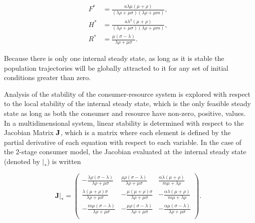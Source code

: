 \documentclass[12pt,english]{article}
\begin{document}
\begin{spacing}{1.9}
\begin{align}
F^* &= \frac{a  \lambda  \mu  (\mu +\rho )}{(\lambda  \rho +\mu  \sigma ) (\lambda  \rho +\mu  m)}, \nonumber \\
H^* &= \frac{a  \lambda ^2 (\mu +\rho )}{(\lambda  \rho +\mu  \sigma ) (\lambda  \rho +\mu  m)}, \nonumber \\
R^* &= \frac{\mu  (\sigma -\lambda )}{\lambda  \rho +\mu  \sigma }.
\end{align}

\noindent Because there is only one internal steady state, as long as it is stable the population trajectories will be globally attracted to it for any set of initial conditions greater than zero.

Analysis of the stability of the consumer-resource system is explored with respect to the local stability of the internal steady state, which is the only feasible steady state as long as both the consumer and resource have non-zero, positive, values.
In a multidimensional system, linear stability is determined with respect to the Jacobian Matrix $\bf J$, which is a matrix where each element is defined by the partial derivative of each equation with respect to each variable.
In the case of the 2-stage consumer model, the Jacobian evaluated at the internal steady state (denoted by $|_*$) is written

\begin{equation}
\mathbf{J}|_* =
\left(
\begin{array}{ccc}
 -\frac{\lambda  \rho  (\sigma - \lambda )}{\lambda  \rho +\mu  \sigma } & \frac{\mu  \rho  (\sigma -\lambda )}{\lambda  \rho +\mu  \sigma } & \frac{\alpha  \lambda  (\mu +\rho )}{m \mu +\lambda  \rho } \\
 \frac{\lambda  (\mu +\rho ) \sigma }{\lambda  \rho +\mu  \sigma } & -\frac{\mu  (\mu +\rho ) \sigma }{\lambda  \rho +\mu  \sigma } & -\frac{\alpha  \lambda  (\mu +\rho )}{m \mu +\lambda  \rho } \\
 -\frac{m \mu  (\sigma - \lambda)}{\lambda  \rho +\mu  \sigma } & -\frac{\mu  \rho  (\sigma - \lambda )}{\lambda  \rho +\mu  \sigma } & -\frac{\alpha  \mu  (\sigma - \lambda)}{\lambda  \rho +\mu  \sigma } \\
\end{array}
\right).
\end{equation}



\end{spacing}
\end{document}
